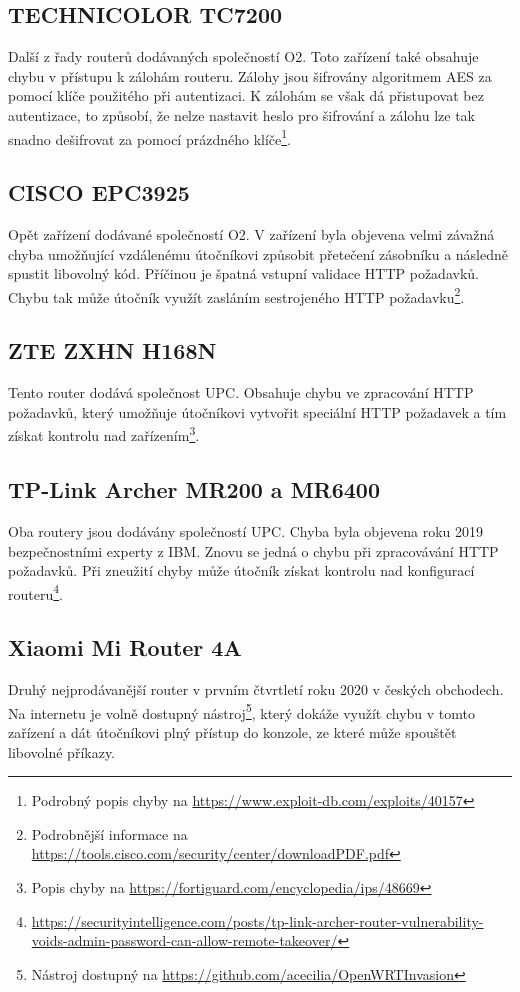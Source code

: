 \subsection*{TECHNICOLOR TC7200}
Další z řady routerů dodávaných společností O2. Toto zařízení také obsahuje chybu v přístupu k zálohám routeru. Zálohy jsou šifrovány algoritmem AES za pomocí klíče použitého při autentizaci. K zálohám se však dá přistupovat bez autentizace, to způsobí, že nelze nastavit heslo pro šifrování a zálohu lze tak snadno dešifrovat za pomocí prázdného klíče\footnote{Podrobný popis chyby na \url{https://www.exploit-db.com/exploits/40157}}.

\subsection*{CISCO EPC3925}
Opět zařízení dodávané společností O2. V zařízení byla objevena velmi závažná chyba umožňující vzdálenému útočníkovi způsobit přetečení zásobníku a následně spustit libovolný kód. Příčinou je špatná vstupní validace HTTP požadavků. Chybu tak může útočník využít zasláním sestrojeného HTTP požadavku\footnote{Podrobnější informace na \url{https://tools.cisco.com/security/center/downloadPDF.pdf}}.

\subsection*{ZTE ZXHN H168N}
Tento router dodává společnost UPC. Obsahuje chybu ve zpracování HTTP požadavků, který umožňuje útočníkovi vytvořit speciální HTTP požadavek a tím získat kontrolu nad zařízením\footnote{Popis chyby na \url{https://fortiguard.com/encyclopedia/ips/48669}}.

\subsection*{TP-Link Archer MR200 a MR6400}
Oba routery jsou dodávány společností UPC. Chyba byla objevena roku 2019 bezpečnostními experty z IBM. Znovu se jedná o chybu při zpracovávání HTTP požadavků. Při zneužití chyby může útočník získat kontrolu nad konfigurací routeru\footnote{\url{https://securityintelligence.com/posts/tp-link-archer-router-vulnerability-voids-admin-password-can-allow-remote-takeover/}}.

\subsection*{Xiaomi Mi Router 4A}
Druhý nejprodávanější router v prvním čtvrtletí roku 2020 v českých obchodech. Na internetu je volně dostupný nástroj\footnote{Nástroj dostupný na \url{https://github.com/acecilia/OpenWRTInvasion}}, který dokáže využít chybu v tomto zařízení a dát útočníkovi plný přístup do konzole, ze které může spouštět libovolné příkazy. 

